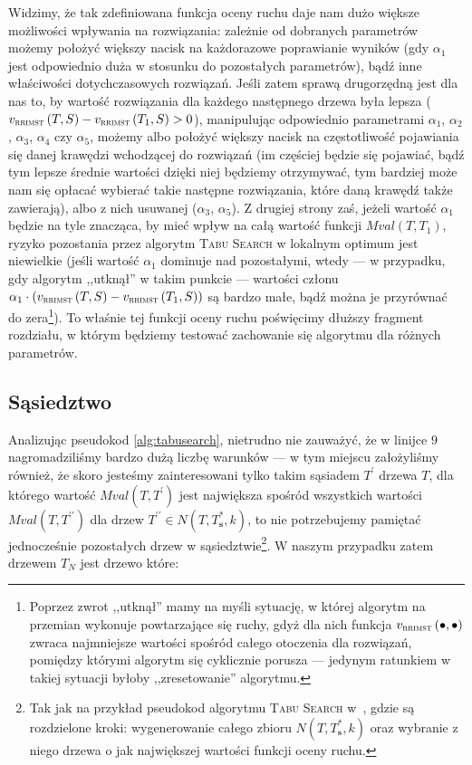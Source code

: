 Widzimy, że tak zdefiniowana funkcja oceny ruchu daje nam dużo większe możliwości wpływania na rozwiązania: zależnie od dobranych parametrów możemy położyć większy nacisk na każdorazowe poprawianie wyników (gdy $\alpha_{1}$ jest odpowiednio duża w stosunku do pozostałych parametrów), bądź inne właściwości dotychczasowych rozwiązań. Jeśli zatem sprawą drugorzędną jest dla nas to, by wartość rozwiązania dla każdego następnego drzewa była lepsza ($v_{\textsc{rrimst}} \left( T, S \right) - v_{\textsc{rrimst}} \left( T_{1}, S \right) > 0$), manipulując odpowiednio parametrami $\alpha_{1}$, $\alpha_{2}$, $\alpha_{3}$, $\alpha_{4}$ czy $\alpha_{5}$, możemy albo położyć większy nacisk na częstotliwość pojawiania się danej krawędzi wchodzącej do rozwiązań (im częściej będzie się pojawiać, bądź tym lepsze średnie wartości dzięki niej będziemy otrzymywać, tym bardziej może nam się opłacać wybierać takie następne rozwiązania, które daną krawędź także zawierają), albo z nich usuwanej ($\alpha_{3}$, $\alpha_{5}$). Z drugiej strony zaś, jeżeli wartość $\alpha_{1}$ będzie na tyle znacząca, by mieć wpływ na całą wartość funkcji $Mval \left( T, T_{1} \right)$, ryzyko pozostania przez algorytm \textsc{Tabu Search} w lokalnym optimum jest niewielkie (jeśli wartość $\alpha_{1}$ dominuje nad pozostałymi, wtedy --- w przypadku, gdy algorytm ,,utknął'' w takim punkcie --- wartości członu $\alpha_{1} \cdot \left( v_{\textsc{rrimst}} \left( T, S \right) - v_{\textsc{rrimst}} \left( T_{1}, S \right) \right)$ są bardzo małe, bądź można je przyrównać do zera\footnote{Poprzez zwrot ,,utknął'' mamy na myśli sytuację, w której algorytm na przemian wykonuje powtarzające się ruchy, gdyż dla nich funkcja $v_{\textsc{rrimst}} \left( \bullet, \bullet \right)$ zwraca najmniejsze wartości spośród całego otoczenia dla rozwiązań, pomiędzy którymi algorytm się cyklicznie porusza --- jedynym ratunkiem w takiej sytuacji byłoby ,,zresetowanie'' algorytmu.}). To właśnie tej funkcji oceny ruchu poświęcimy dłuższy fragment rozdziału, w którym będziemy testować zachowanie się algorytmu dla różnych parametrów.

\subsection{Sąsiedztwo}

Analizując pseudokod \ref{alg:tabusearch}, nietrudno nie zauważyć, że w linijce $9$ nagromadziliśmy bardzo dużą liczbę warunków --- w tym miejscu założyliśmy również, że skoro jesteśmy zainteresowani tylko takim sąsiadem $T^{\prime}$ drzewa $T$, dla którego wartość $Mval \left( T, T^{\prime} \right)$ jest największa spośród wszystkich wartości $Mval \left( T, T^{\prime\prime} \right)$ dla drzew $T^{\prime\prime} \in N \left( T, T^{\ast}_{\textbf{s}}, k \right)$, to nie potrzebujemy pamiętać jednocześnie pozostałych drzew w sąsiedztwie\footnote{Tak jak na przykład pseudokod algorytmu \textsc{Tabu Search} w~\cite{Kasperski2012}, gdzie są rozdzielone kroki: wygenerowanie całego zbioru $N \left( T, T^{\ast}_{\textbf{s}}, k \right)$ oraz wybranie z niego drzewa o jak największej wartości funkcji oceny ruchu.}. W naszym przypadku zatem drzewem $T_{N}$ jest drzewo które:

